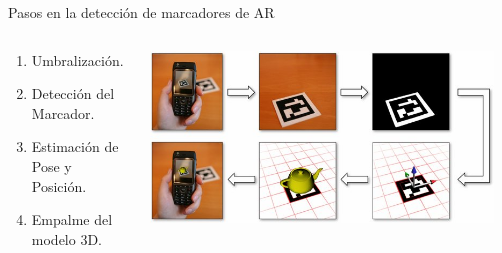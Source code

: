 \begin{frame}{Pasos en la detección de marcadores de AR \footnotemark}
\begin{columns}
\begin{column}{0.39\textwidth}
\begin{enumerate}
\item Umbralización.
\item Detección del Marcador.
\item Estimación de Pose y Posición.
\item Empalme del modelo 3D.
\end{enumerate}
\end{column}
\begin{column}{0.59\textwidth}
\begin{center}
\includegraphics[width=0.95\textwidth]{Figs/AR_WorkFlow}
\end{center}
\end{column}
\end{columns}
\end{frame}


